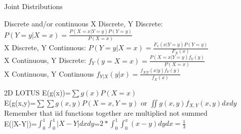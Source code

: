 \documentclass[a4paper, 12pt]{article}
\begin{document}
\begin{section}{Joint Distributions}
\begin{subsection}{Discrete and/or continuous}
X Discrete, Y Discrete: $P(Y=y|X=x)=\frac{P(X=x|Y=y)P(Y=y)}{P(X=x)}$\\
X Discrete, Y Continuous: $P(Y=y|X=x)=\frac{F_{x}(x|Y=y)P(Y=y)}{F_{X}(x)}$\\
X Continuous, Y Discrete: $f_{Y}(y=X=x)=\frac{P(X=x|Y=y)f_{Y}(y)}{P(X=x)}$\\
X Continuous, Y Continuous $f_{Y|X}(y|x)=\frac{f_{X|Y}(x|y)f_{Y}(y)}{f_{X}(x)}$\\
\end{subsection}
\begin{subsection}{2D LOTUS}
E(g(x))=$\sum g(x)P(X=x)$\\
E(g(x,y)=$\sum\sum g(x,y)P(X=x,Y=y)$ or $\iint g(x,y)f_{X,Y}(x,y)dxdy$\\
Remember that iid functions together are multiplied not summed\\
E(|X-Y|)=$\int_{0}^{1}\int_{0}^{1}|X-Y|dxdy$=$2*\int_{0}^{1}\int_{0}^{x}(x-y)dydx=\frac{1}{3}$
\end{subsection}
\end{section}
\end{document}
